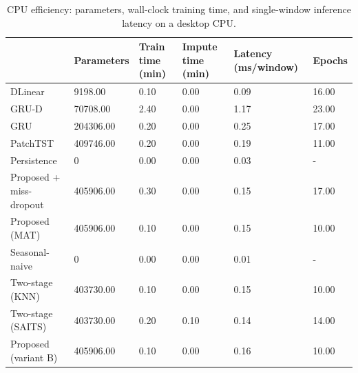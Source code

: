 \begin{table}
\caption{CPU efficiency: parameters, wall-clock training time, and single-window inference latency on a desktop CPU.}
\label{tab:efficiency}
\begin{tabular}{llllll}
\toprule
 & Parameters & Train time (min) & Impute time (min) & Latency (ms/window) & Epochs \\
\midrule
DLinear & 9198.00 & 0.10 & 0.00 & 0.09 & 16.00 \\
GRU-D & 70708.00 & 2.40 & 0.00 & 1.17 & 23.00 \\
GRU & 204306.00 & 0.20 & 0.00 & 0.25 & 17.00 \\
PatchTST & 409746.00 & 0.20 & 0.00 & 0.19 & 11.00 \\
Persistence & 0 & 0.00 & 0.00 & 0.03 & - \\
Proposed + miss-dropout & 405906.00 & 0.30 & 0.00 & 0.15 & 17.00 \\
Proposed (MAT) & 405906.00 & 0.10 & 0.00 & 0.15 & 10.00 \\
Seasonal-naive & 0 & 0.00 & 0.00 & 0.01 & - \\
Two-stage (KNN) & 403730.00 & 0.10 & 0.00 & 0.15 & 10.00 \\
Two-stage (SAITS) & 403730.00 & 0.20 & 0.10 & 0.14 & 14.00 \\
Proposed (variant B) & 405906.00 & 0.10 & 0.00 & 0.16 & 10.00 \\
\bottomrule
\end{tabular}
\end{table}
